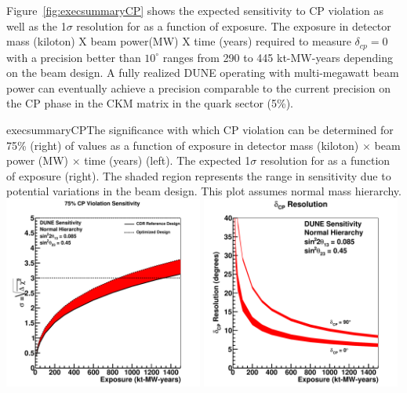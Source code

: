 Figure~\ref{fig:execsummaryCP} shows the expected sensitivity to CP
violation as well as the 1$\sigma$ resolution for \deltacp as a
function of exposure.  The exposure in detector mass (kiloton) X beam
power(MW) X time (years) required to measure $\delta_{cp} = 0 $ with a
precision better than $10^\circ$ ranges from 290 to 445 kt-MW-years
depending on the beam design.  
A fully realized 
DUNE operating with multi-megawatt 
beam power can eventually achieve a precision 
comparable to the current precision on the CP phase in the
CKM matrix in the quark sector (5\%).
%
\begin{cdrfigure}{execsummaryCP}{The
    significance with which CP violation can be determined for 75\%
    (right) of \deltacp values as a function of exposure in detector
    mass (kiloton) $\times$ beam power (MW) $\times$ time (years)
    (left). The expected 1$\sigma$ resolution for \deltacp as a
    function of exposure (right). The shaded region represents the
    range in sensitivity due to potential variations in the beam
    design. This plot assumes normal mass hierarchy.}
\includegraphics[width=0.49\textwidth]{volume-physics/figures/cpv75_exp}
 \includegraphics[width=0.49\textwidth]{volume-physics/figures/res_dcp_exp}
\end{cdrfigure}

